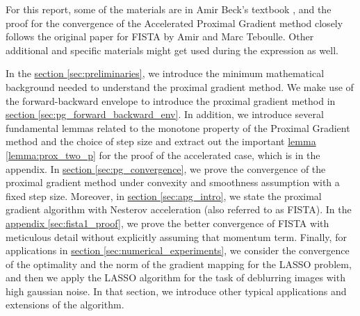 \documentclass[]{article}
\theoremstyle{definition}
\begin{document}
    \par
    For this report, some of the materials are in Amir Beck's textbook \cite{book:first_order_opt}, and the proof for the convergence of the Accelerated Proximal Gradient method closely follows the original paper for FISTA\cite{paper:FISTA} by Amir and Marc Teboulle. Other additional and specific materials might get used during the expression as well. 
    \par 
    In the \hyperref[sec:preliminaries]{section \ref*{sec:preliminaries}}, we introduce the minimum mathematical background needed to understand the proximal gradient method. We make use of the forward-backward envelope to introduce the proximal gradient method in \hyperref[sec:pg_forward_backward_env]{section \ref*{sec:pg_forward_backward_env}}. In addition, we introduce several fundamental lemmas related to the monotone property of the Proximal Gradient method and the choice of step size and extract out the important \hyperref[lemma:prox_two_p]{lemma \ref*{lemma:prox_two_p}} for the proof of the accelerated case, which is in the appendix. In \hyperref[sec:pg_convergence]{section \ref*{sec:pg_convergence}}, we prove the convergence of the proximal gradient method under convexity and smoothness assumption with a fixed step size. Moreover, in \hyperref[sec:apg_intro]{section \ref*{sec:apg_intro}}, we state the proximal gradient algorithm with Nesterov acceleration (also referred to as FISTA). In the \hyperref[alg:fista_1]{appendix \ref*{sec:fista1_proof}}, we prove the better convergence of FISTA with meticulous detail without explicitly assuming that momentum term. Finally, for applications in \hyperref[sec:numerical_experiments]{section \ref*{sec:numerical_experiments}}, we consider the convergence of the optimality and the norm of the gradient mapping for the LASSO problem, and then we apply the LASSO algorithm for the task of deblurring images with high gaussian noise. In that section, we introduce other typical applications and extensions of the algorithm. 
\end{document}
